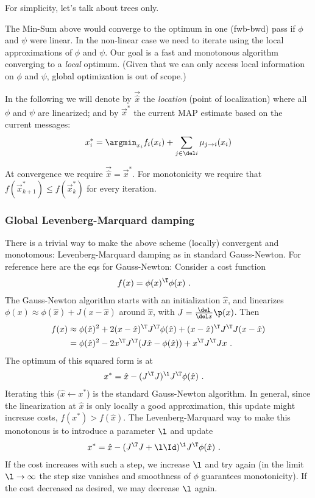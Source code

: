 For simplicity, let's talk about trees only.

The Min-Sum above would converge to the optimum in one (fwb-bwd) pass if $\phi$
and $\psi$ were linear. In the non-linear case we need to iterate
using the local approximations of $\phi$ and $\psi$. Our goal is a
fast and monotonous algorithm converging to a \emph{local}
optimum. (Given that we can only access local information on $\phi$
and $\psi$, global optimization is out of scope.)

In the following we will denote by $\vec{\hat x}$ the \emph{location}
(point of localization) where all $\phi$ and $\psi$ are linearized;
and by $\vec x^*$ the current MAP estimate based on the current
messages:
\begin{align}
x_i^* = \argmin_{x_i}  f_i(x_i) + \sum_{j\in\del i} \mu_{j\to i}(x_i)
\end{align}

At convergence we require $\vec{\hat x} = \vec x^*$. For monotonicity
we require that $f(\vec x^*_{k+1}) \le f(\vec x^*_k)$ for every
iteration.

\subsubsection{Global Levenberg-Marquard damping}

There is a trivial way to make the above scheme (locally) convergent
and monotomous: Levenberg-Marquard damping as in standard
Gauss-Newton. For reference here are the eqs for Gauss-Newton:
Consider a cost function
\begin{align}
f(x)
 &= \phi(x)^\T \phi(x) ~.
\end{align}
The Gauss-Newton algorithm starts with an initialization $\hat x$, and
linearizes $\phi(x) \approx \phi(\hat x) + J (x-\hat x)$ around $\hat
x$, with $J=\frac{\del}{\del x}\p(x)$. Then
\begin{align}
f(x)
 &\approx
  \phi(\hat x)^2 + 2 (x-\hat x)^\T J^\T \phi(\hat x) + (x-\hat x)^\T J^\T J (x-\hat x) \\
 &=
  \phi(\hat x)^2 - 2 x^\T J^\T (J \hat x - \phi(\hat x)) + x^\T J^\T J x ~.
\end{align}
The optimum of this squared form is at
\begin{align}
x^* &=  \hat x - (J^\T J)^\1 J^\T \phi(\hat x) ~.
\end{align}
Iterating this ($\hat x \gets x^*$) is the standard Gauss-Newton
algorithm. In general, since the linearization at $\hat x$ is only
locally a good approximation, this update might increase costs,
$f(x^*) > f(\hat x)$. The Levenberg-Marquard way to make this
monotonous is to introduce a parameter $\l$ and update
\begin{align}
x^* &=  \hat x - (J^\T J + \l \Id)^\1 J^\T \phi(\hat x) ~.
\end{align}
If the cost increases with such a step, we increase $\l$ and try again
(in the limit $\l\to\infty$ the step size vanishes and smoothness of
$\phi$ guarantees monotonicity). If the cost decreased as desired, we
may decrease $\l$ again.

